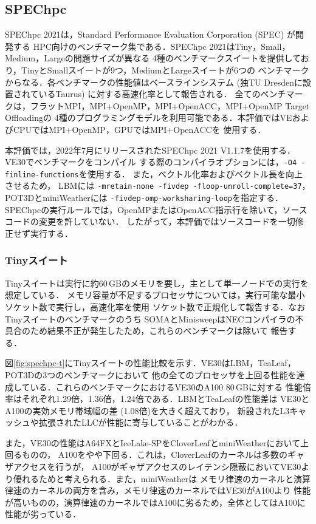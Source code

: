 ﻿\documentclass[submit,techrep,noauthor]{ipsj}
\begin{document}
\subsection{SPEChpc}\label{sec:spechpc}

SPEChpc 2021\cite{Li2022}は，Standard Performance Evaluation Corporation (SPEC) が開発する
HPC向けのベンチマーク集である．SPEChpc 2021はTiny，Small，Medium，Largeの問題サイズが異なる
4種のベンチマークスイートを提供しており，TinyとSmallスイートが9つ，MediumとLargeスイートが6つの
ベンチマークからなる．各ベンチマークの性能値はベースラインシステム (独TU Dresdenに設置されているTaurus) 
に対する高速化率として報告される．
全てのベンチマークは，フラットMPI，MPI+OpenMP，MPI+OpenACC，MPI+OpenMP Target Offloadingの
4種のプログラミングモデルを利用可能である．本評価ではVEおよびCPUではMPI+OpenMP，GPUではMPI+OpenACCを
使用する．

本評価では，2022年7月にリリースされたSPEChpc 2021 V1.1.7を使用する．VE30でベンチマークをコンパイル
する際のコンパイラオプションには，\texttt{-O4 -finline-functions}を使用する．
また，ベクトル化率およびベクトル長を向上させるため，
LBMには \texttt{-mretain-none -fivdep -floop-unroll-complete=37}，
POT3DとminiWeatherには \texttt{-fivdep-omp-worksharing-loop}を指定する．
SPEChpcの実行ルールでは，OpenMPまたはOpenACC指示行を除いて，ソースコードの変更を許していない．
したがって，本評価ではソースコードを一切修正せず実行する．

\subsubsection{Tinyスイート}

Tinyスイートは実行に約60\,GBのメモリを要し，主として単一ノードでの実行を想定している．
メモリ容量が不足するプロセッサについては，実行可能な最小ソケット数で実行し，高速化率を使用
ソケット数で正規化して報告する．なおTinyスイートのベンチマークのうち
SOMAとMinisweepはNECコンパイラの不具合のため結果不正が発生したため，これらのベンチマークは除いて
報告する．

図\ref{fig:spechpc-t}にTinyスイートの性能比較を示す．VE30はLBM，TeaLeaf，POT3Dの3つのベンチマークにおいて
他の全てのプロセッサを上回る性能を達成している．これらのベンチマークにおけるVE30のA100 80\,GBに対する
性能倍率はそれぞれ1.29倍，1.36倍，1.24倍である．LBMとTeaLeafの性能差は
VE30とA100の実効メモリ帯域幅の差 (1.08倍)を大きく超えており，
新設されたL3キャッシュや拡張されたLLCが性能に寄与していることがわかる．

また，VE30の性能はA64FXとIceLake-SPをCloverLeafとminiWeatherにおいて上回るものの，
A100をやや下回る．これは，CloverLeafのカーネルは多数のギャザアクセスを行うが，
A100がギャザアクセスのレイテンシ隠蔽においてVE30より優れるためと考えられる．また，miniWeatherは
メモリ律速のカーネルと演算律速のカーネルの両方を含み，メモリ律速のカーネルではVE30がA100より
性能が高いものの，演算律速のカーネルではA100に劣るため，全体としてはA100に性能が劣っている．
\end{document}
